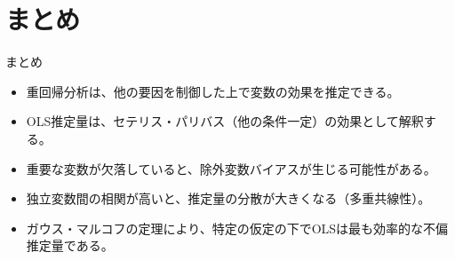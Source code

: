 \documentclass[
  ignorenonframetext,
]{beamer}
\providecommand{\tightlist}{%
  \setlength{\itemsep}{0pt}\setlength{\parskip}{0pt}}
\begin{document}
\hypertarget{ux307eux3068ux3081}{%
\section{まとめ}\label{ux307eux3068ux3081}}

\begin{frame}{まとめ}
\protect\hypertarget{ux307eux3068ux3081-1}{}
\begin{itemize}
\tightlist
\item
  重回帰分析は、他の要因を制御した上で変数の効果を推定できる。
\item
  OLS推定量は、セテリス・パリバス（他の条件一定）の効果として解釈する。
\item
  重要な変数が欠落していると、除外変数バイアスが生じる可能性がある。
\item
  独立変数間の相関が高いと、推定量の分散が大きくなる（多重共線性）。
\item
  ガウス・マルコフの定理により、特定の仮定の下でOLSは最も効率的な不偏推定量である。
\end{itemize}
\end{frame}
\end{document}
